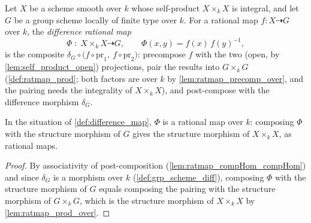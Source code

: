 \begin{definition}
  \label{def:difference_map}
  \leanok
  Let \(X\) be a scheme smooth over \(k\) whose self-product \(X \times_k X\) is
  integral, and let \(G\) be a group scheme locally of finite type over \(k\).
  For a rational map \(f : X \dashrightarrow G\) over \(k\), the
  \emph{difference rational map}
  \[
    \Phi \;:\; X \times_k X \dashrightarrow G,
    \qquad
    \Phi(x, y) = f(x)\, f(y)^{-1},
  \]
  is the composite \(\delta_G \circ \bigl(f \circ \mathrm{pr}_1,\ f \circ
  \mathrm{pr}_2\bigr)\): precompose \(f\) with the two (open, by
  \ref{lem:self_product_open}) projections, pair the results into
  \(G \times_k G\) (\ref{def:ratmap_prod}; both factors are over \(k\) by
  \ref{lem:ratmap_precomp_over}, and the pairing needs the integrality of
  \(X \times_k X\)), and post-compose with the difference morphism
  \(\delta_G\).
\end{definition}

\begin{lemma}
  \label{lem:difference_map_over}
  \leanok
  In the situation of \ref{def:difference_map}, \(\Phi\) is a rational map over
  \(k\): composing \(\Phi\) with the structure morphism of \(G\) gives the
  structure morphism of \(X \times_k X\), as rational maps.
\end{lemma}
\begin{proof}
  \leanok
  By associativity of post-composition (\ref{lem:ratmap_compHom_compHom}) and
  since \(\delta_G\) is a morphism over \(k\) (\ref{def:grp_scheme_diff}),
  composing \(\Phi\) with the structure morphism of \(G\) equals composing the
  pairing with the structure morphism of \(G \times_k G\), which is the
  structure morphism of \(X \times_k X\) by \ref{lem:ratmap_prod_over}.
\end{proof}

